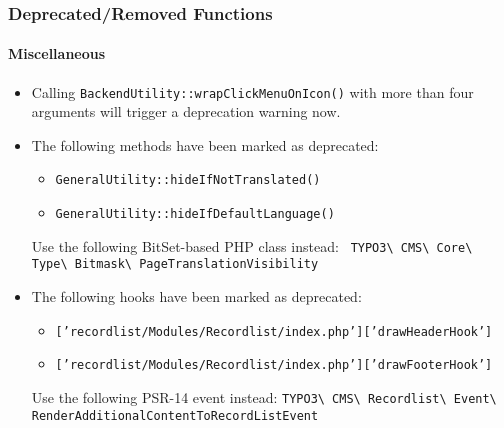 %

\begin{frame}[fragile]
	\frametitle{Deprecated/Removed Functions}
	\framesubtitle{Miscellaneous}

	\begin{itemize}
		\item Calling \texttt{BackendUtility::wrapClickMenuOnIcon()} with more
			than four arguments will trigger a deprecation warning now.
		\item The following methods have been marked as deprecated:
			\begin{itemize}\smaller
				\item \texttt{GeneralUtility::hideIfNotTranslated()}
				\item \texttt{GeneralUtility::hideIfDefaultLanguage()}
			\end{itemize}\normalsize
			\small
				Use the following BitSet-based PHP class instead:\newline
				\smaller\texttt{
					TYPO3\textbackslash
					CMS\textbackslash
					Core\textbackslash
					Type\textbackslash
					Bitmask\textbackslash
					PageTranslationVisibility}
			\normalsize

		\item The following hooks have been marked as deprecated:
			\begin{itemize}\smaller
				\item \texttt{['recordlist/Modules/Recordlist/index.php']['drawHeaderHook']}
				\item \texttt{['recordlist/Modules/Recordlist/index.php']['drawFooterHook']}
			\end{itemize}\normalsize
			\small
				Use the following PSR-14 event instead:\newline
				\smaller\texttt{TYPO3\textbackslash
					CMS\textbackslash
					Recordlist\textbackslash
					Event\textbackslash
					RenderAdditionalContentToRecordListEvent}
			\normalsize

	\end{itemize}

\end{frame}

